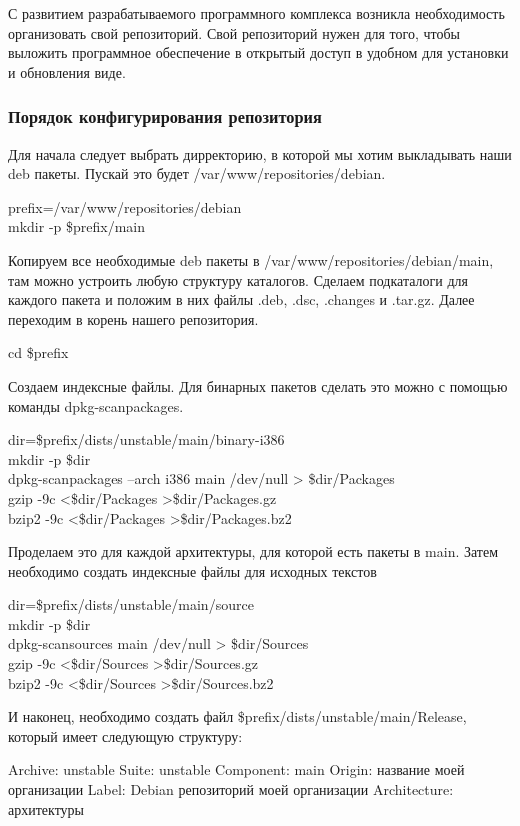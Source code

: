 С развитием разрабатываемого программного комплекса возникла необходимость организовать свой репозиторий. Свой репозиторий нужен для того, чтобы выложить программное обеспечение в открытый доступ в удобном для установки и обновления виде.

\subsubsection{Порядок конфигурирования репозитория}

Для начала следует выбрать дирректорию, в которой мы хотим выкладывать наши deb пакеты. Пускай это будет /var/www/repositories/debian.

\ttfamily prefix=/var/www/repositories/debian\\ mkdir -p \$prefix/main \normalfont

Копируем все необходимые deb пакеты в /var/www/repositories/debian/main, там можно устроить любую структуру каталогов. Сделаем подкаталоги для каждого пакета и положим в них файлы .deb, .dsc, .changes и .tar.gz. Далее переходим в корень нашего репозитория.

\ttfamily cd \$prefix \normalfont

Создаем индексные файлы. Для бинарных пакетов сделать это можно с помощью команды dpkg-scanpackages.

\ttfamily
dir=\$prefix/dists/unstable/main/binary-i386\\
mkdir -p \$dir\\
dpkg-scanpackages --arch i386 main /dev/null > \$dir/Packages\\
gzip -9c <\$dir/Packages >\$dir/Packages.gz\\
bzip2 -9c <\$dir/Packages >\$dir/Packages.bz2
\normalfont

Проделаем это для каждой архитектуры, для которой есть пакеты в main. Затем необходимо создать индексные файлы для исходных текстов

\ttfamily
dir=\$prefix/dists/unstable/main/source\\
mkdir -p \$dir\\
dpkg-scansources main /dev/null > \$dir/Sources\\
gzip -9c <\$dir/Sources >\$dir/Sources.gz\\
bzip2 -9c <\$dir/Sources >\$dir/Sources.bz2
\normalfont

И наконец, необходимо создать файл \$prefix/dists/unstable/main/Release, который имеет следующую структуру:

\ttfamily
Archive: unstable
Suite: unstable
Component: main
Origin: название моей организации
Label: Debian репозиторий моей организации
Architecture: архитектуры
\normalfont


